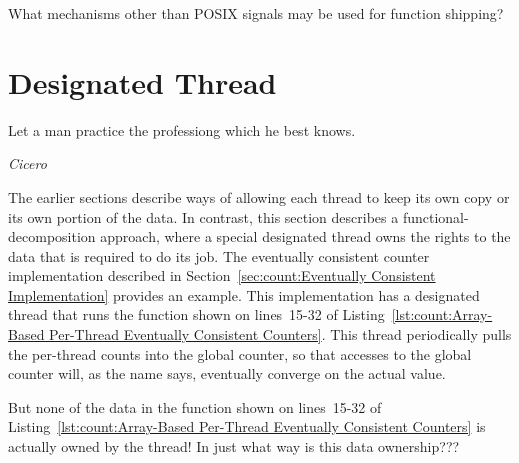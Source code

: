 \QuickQuiz{}
	What mechanisms other than POSIX signals may be used for function
	shipping?
 \QuickQuizEnd

\section{Designated Thread}
\label{sec:owned:Designated Thread}
%
\epigraph{Let a man practice the professiong which he best knows.}
	 {\emph{Cicero}}

The earlier sections describe ways of allowing each thread to keep its
own copy or its own portion of the data.
In contrast, this section describes a functional-decomposition approach,
where a special designated thread owns the rights to the data
that is required to do its job.
The eventually consistent counter implementation described in
Section~\ref{sec:count:Eventually Consistent Implementation} provides an example.
This implementation has a designated thread that runs the
 function shown on lines~15-32 of
Listing~\ref{lst:count:Array-Based Per-Thread Eventually Consistent Counters}.
This  thread periodically pulls the per-thread counts
into the global counter, so that accesses to the global counter will,
as the name says, eventually converge on the actual value.

\QuickQuiz{}
	But none of the data in the  function shown on
	lines~15-32 of
	Listing~\ref{lst:count:Array-Based Per-Thread Eventually Consistent Counters}
	is actually owned by the  thread!
	In just what way is this data ownership???
 \QuickQuizEnd


